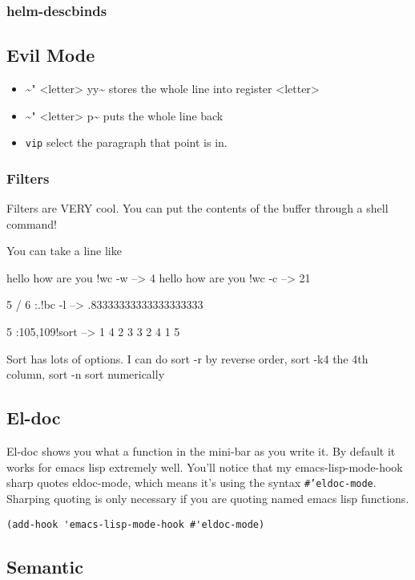 \documentclass[11pt]{article}
\begin{document}
\subsubsection{helm-descbinds}
\label{sec:orgheadline20}
\subsection{Evil Mode}
\label{sec:orgheadline23}
\begin{itemize}
\item \textasciitilde{}" <letter> yy\textasciitilde{}   stores the whole line into register <letter>
\item \textasciitilde{}" <letter> p\textasciitilde{}    puts the whole line back
\item \texttt{vip} select the paragraph that point is in.
\end{itemize}

\subsubsection{Filters}
\label{sec:orgheadline22}
Filters are VERY cool. You can put the contents of the buffer through a shell command!

You can take a line like

hello how are you   !wc -w   -->   4
hello how are you   !wc -c   -->   21

5 / 6  :.!bc -l   -->  .83333333333333333333

5    :105,109!sort --> 1
4                    2
3                    3
2                    4
1                    5

Sort has lots of options.  I can do sort -r by reverse order, sort -k4  the 4th column, sort -n sort numerically

\subsection{El-doc}
\label{sec:orgheadline24}
El-doc shows you what a function in the mini-bar as you write it.  By default it works for emacs lisp extremely well.  You'll notice that my emacs-lisp-mode-hook sharp quotes eldoc-mode, which means it's using the syntax \texttt{\#'eldoc-mode}.  Sharping quoting is only necessary if you are quoting named emacs lisp functions.
\begin{verbatim}
(add-hook 'emacs-lisp-mode-hook #'eldoc-mode)
\end{verbatim}

\subsection{Semantic}
\label{sec:orgheadline26}
\end{document}
